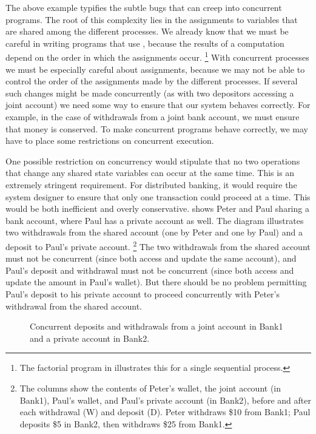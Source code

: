 The above example typifies the subtle bugs that can creep into concurrent programs.
The root of this complexity lies in the assignments to variables that are shared among the different processes.
We already know that we must be careful in writing programs that use , because the results of a computation depend on the order in which the assignments occur.%
\footnote{
	The factorial program in  illustrates this for a single sequential process.
}
With concurrent processes we must be especially careful about assignments, because we may not be able to control the order of the assignments made by the different processes.
If several such changes might be made concurrently (as with two depositors accessing a joint account) we need some way to ensure that our system behaves correctly.
For example, in the case of withdrawals from a joint bank account, we must ensure that money is conserved.
To make concurrent programs behave correctly, we may have to place some restrictions on concurrent execution.

One possible restriction on concurrency would stipulate that no two operations that change any shared state variables can occur at the same time.
This is an extremely stringent requirement.
For distributed banking, it would require the system designer to ensure that only one transaction could proceed at a time.
This would be both inefficient and overly conservative.
 shows Peter and Paul sharing a bank account, where Paul has a private account as well.
The diagram illustrates two withdrawals from the shared account (one by Peter and one by Paul) and a deposit to Paul’s private account.%
\footnote{
	The columns show the contents of Peter’s wallet, the joint account (in Bank1), Paul’s wallet, and Paul’s private account (in Bank2), before and after each withdrawal (W) and deposit (D).
	Peter withdraws \$10 from Bank1;
	Paul deposits \$5 in Bank2, then withdraws \$25 from Bank1.
}
The two withdrawals from the shared account must not be concurrent (since both access and update the same account), and Paul’s deposit and withdrawal must not be concurrent (since both access and update the amount in Paul’s wallet).
But there should be no problem permitting Paul’s deposit to his private account to proceed concurrently with Peter’s withdrawal from the shared account.

\begin{figure}[tb]
	\centering
	
	\caption{
		Concurrent deposits and withdrawals from a joint account in Bank1 and a private account in Bank2.
	}
	\label{Figure 3.30}
\end{figure}

